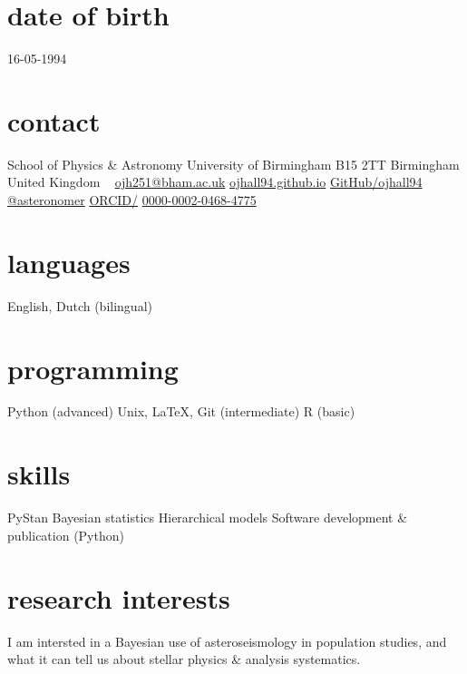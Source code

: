 \documentclass[]{k-cv} %
\begin{document}


\begin{aside} %
\section{date of birth}
\color{gray}16-05-1994
\section{contact}
School of Physics \& Astronomy
University of Birmingham
B15 2TT
Birmingham
United Kingdom
~
\href{mailto:ojh251@student.bham.ac.uk}{ojh251@bham.ac.uk}
\href{http://www.ojhall94.github.io}{ojhall94.github.io}
\href{http://www.github.com/ojhall94}{GitHub/ojhall94}
\href{http://www.twitter.com/asteronomer}{@asteronomer}
\href{http://www.orcid.com/0000-0002-0468-4775}{ORCID/}
\href{http://www.orcid.com/0000-0002-0468-4775}{0000-0002-0468-4775}
\section{languages}
English, Dutch (bilingual)
\section{programming}
Python (advanced)
Unix, LaTeX, Git (intermediate)
R (basic)
\section{skills}
PyStan
Bayesian statistics
Hierarchical models
Software development \& publication (Python)
\end{aside}

\section{research interests}
\bodyfont I am intersted in a Bayesian use of asteroseismology in population studies, and what it can tell us about stellar physics \& analysis systematics.
\end{document}

